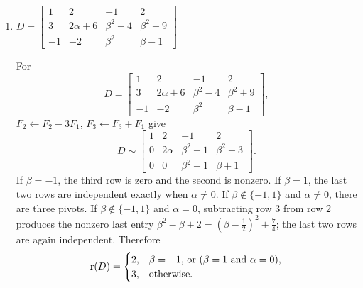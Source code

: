 \begin{enumerate}[label=\alph*)]
\begin{answer}
For
$C=\begin{bmatrix}-1&1&3\\1&\alpha-1&-\alpha-3\\-1-\alpha&2-\alpha&3\alpha+5\end{bmatrix}$,
apply $F_2\gets F_2+F_1$, $F_3\gets F_3-(1+\alpha)F_1$,
$F_3\gets F_3+2F_2$, $F_2\leftrightarrow F_3$,
$F_3\gets F_3-\alpha F_2$. This gives
\[
 C\sim\begin{bmatrix}-1&1&3\\0&1&2-2\alpha\\0&0&\alpha(2\alpha-3)\end{bmatrix}.
\]
No division by a parameter was used. Hence $\rank(C)=2$ for
$\alpha\in\{0,\frac32\}$, and $\rank(C)=3$ otherwise.
\end{answer}

\item $D=\begin{bmatrix}1&2&-1&2\\3&2\alpha+6&\beta^2-4&\beta^2+9\\-1&-2&\beta^2&\beta-1\end{bmatrix}$

\begin{answer}
For
\[
D=\begin{bmatrix}1&2&-1&2\\3&2\alpha+6&\beta^2-4&\beta^2+9\\-1&-2&\beta^2&\beta-1\end{bmatrix},
\]
$F_2\gets F_2-3F_1$, $F_3\gets F_3+F_1$ give
\[
 D\sim\begin{bmatrix}1&2&-1&2\\0&2\alpha&\beta^2-1&\beta^2+3\\0&0&\beta^2-1&\beta+1\end{bmatrix}.
\]
If $\beta=-1$, the third row is zero and the second is nonzero.
If $\beta=1$, the last two rows are independent exactly when $\alpha\ne0$.
If $\beta\notin\{-1,1\}$ and $\alpha\ne0$, there are three pivots.
If $\beta\notin\{-1,1\}$ and $\alpha=0$, subtracting row $3$ from row $2$
produces the nonzero last entry
$\beta^2-\beta+2=(\beta-\frac12)^2+\frac74$;
the last two rows are again independent. Therefore
\[
 \operatorname{r}(D)=\begin{cases}
 2,&\beta=-1\text{, or }(\beta=1\text{ and }\alpha=0),\\
 3,&\text{otherwise}.
 \end{cases}
\]
\end{answer}
\end{enumerate}
